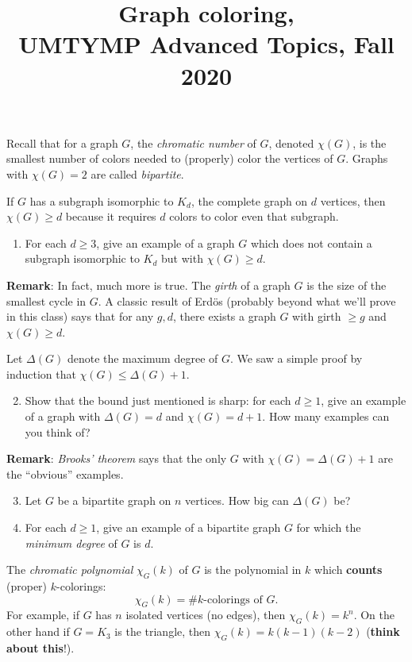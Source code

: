 \documentclass[11pt]{article}
\title{Graph coloring, \\UMTYMP Advanced Topics, Fall 2020}
\date{}
\begin{document}
\maketitle

Recall that for a graph $G$, the \emph{chromatic number} of $G$, denoted $\chi(G)$, is the smallest number of colors needed to (properly) color the vertices of $G$. Graphs with $\chi(G)=2$ are called \emph{bipartite}.

If $G$ has a subgraph isomorphic to $K_d$, the complete graph on $d$ vertices, then $\chi(G) \geq d$ because it requires $d$ colors to color even that subgraph.

\begin{enumerate}
\item For each $d \geq 3$, give an example of a graph $G$ which does not contain a subgraph isomorphic to $K_d$ but with $\chi(G) \geq d$.
\end{enumerate}

{\bf Remark}: In fact, much more is true. The \emph{girth} of a graph $G$ is the size of the smallest cycle in $G$. A classic result of Erd\"{o}s (probably beyond what we'll prove in this class) says that for any $g,d$, there exists a graph $G$ with girth $\geq g$ and $\chi(G) \geq d$.
\medskip

Let $\Delta(G)$ denote the maximum degree of $G$. We saw a simple proof by induction that $\chi(G) \leq \Delta(G)+1$.

\begin{enumerate}
\setcounter{enumi}{1}
\item Show that the bound just mentioned is sharp: for each $d \geq 1$, give an example of a graph with $\Delta(G)=d$ and $\chi(G) = d+1$. How many examples can you think of?
\end{enumerate}

{\bf Remark}: \emph{Brooks' theorem} says that the only $G$ with $\chi(G) = \Delta(G)+1$ are the ``obvious'' examples.

\begin{enumerate}
\setcounter{enumi}{2}
\item Let $G$ be a bipartite graph on $n$ vertices. How big can $\Delta(G)$ be?
\item For each $d \geq 1$, give an example of a bipartite graph $G$ for which the \emph{minimum degree} of $G$ is $d$.
\end{enumerate}

\pagebreak

The \emph{chromatic polynomial} $\chi_G(k)$ of $G$ is the polynomial in $k$ which {\bf counts} (proper) $k$-colorings:
\[ \chi_G(k) = \#\textrm{$k$-colorings of $G$}.\]
For example, if $G$ has $n$ isolated vertices (no edges), then $\chi_G(k) = k^n$. On the other hand if $G = K_3$ is the triangle, then $\chi_G(k) = k(k-1)(k-2)$ ({\bf think about this}!).
\end{document}
